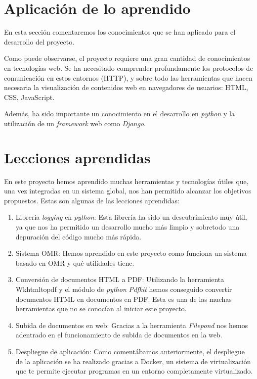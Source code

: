 \documentclass[a4paper, 12pt]{book}
\begin{document}
\section{Aplicación de lo aprendido}
\label{sec:aplicacion}

En esta sección comentaremos los conocimientos que se han aplicado
para el desarrollo del proyecto.

Como puede observarse, el proyecto requiere una gran cantidad de
conocimientos en tecnologías web. Se ha necesitado comprender
profundamente los protocolos de comunicación en estos entornos (HTTP),
y sobre todo las herramientas que hacen necesaria la visualización
de contenidos web en navegadores de usuarios: HTML, CSS, JavaScript.

Además, ha sido importante un conocimiento en el desarrollo en \textit{python}
y la utilización de un \textit{framework} web como \textit{Django}.

\section{Lecciones aprendidas}
\label{sec:lecciones_aprendidas}

En este proyecto hemos aprendido muchas herramientas y tecnologías
útiles que, una vez integradas en un sistema global, nos han permitido
alcanzar los objetivos propuestos. Estas son algunas de las lecciones
aprendidas:

\begin{enumerate}
  \item Librería \textit{logging} en \textit{python}: Esta librería ha sido un descubrimiento
  muy útil, ya que nos ha permitido un desarrollo mucho más limpio y sobretodo
  una depuración del código mucho más rápida.
  \item Sistema OMR: Hemos aprendido en este proyecto como funciona un
  sistema basado en OMR y qué utilidades tiene.
  \item Conversión de documentos HTML a PDF: Utilizando la herramienta
  Wkhtmltopdf y el módulo de \textit{python} \textit{Pdfkit} hemos conseguido convertir
  documentos HTML en documentos en PDF. Esta es una de las muchas
  herramientas que no se conocían al iniciar este proyecto. 
  \item Subida de documentos en web: Gracias a la herramienta \textit{Filepond}
  nos hemos adentrado en el funcionamiento de subida de documentos
  en la web.
  \item Despliegue de aplicación: Como comentábamos anteriormente,
  el despliegue de la aplicación se ha realizado gracias a Docker,
  un sistema de virtualización que te permite ejecutar programas
  en un entorno completamente virtualizado.
\end{enumerate}
\end{document}
